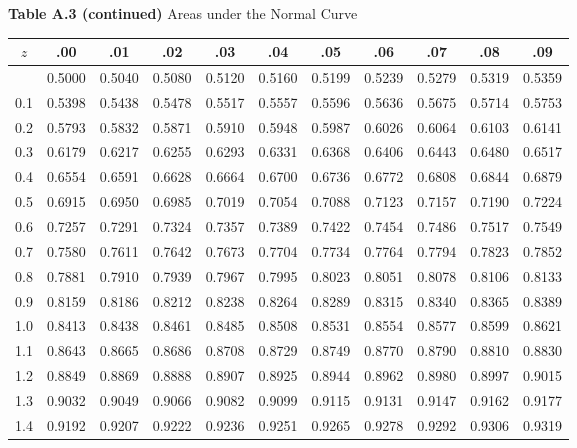 \documentclass[12pt,a4paper]{article}
\begin{document}
\begin{enumerate}
\vspace{0.3cm}
\noindent\textbf{Table A.3 (continued)} Areas under the Normal Curve
\vspace{0.2cm}

\begin{center}
\small
\begin{longtable}{ccccccccccc}
\toprule\toprule
$z$ & .00 & .01 & .02 & .03 & .04 & .05 & .06 & .07 & .08 & .09 \\
\midrule
\endhead
\bottomrule\bottomrule
\endfoot
0.0 & 0.5000 & 0.5040 & 0.5080 & 0.5120 & 0.5160 & 0.5199 & 0.5239 & 0.5279 & 0.5319 & 0.5359 \\
0.1 & 0.5398 & 0.5438 & 0.5478 & 0.5517 & 0.5557 & 0.5596 & 0.5636 & 0.5675 & 0.5714 & 0.5753 \\
0.2 & 0.5793 & 0.5832 & 0.5871 & 0.5910 & 0.5948 & 0.5987 & 0.6026 & 0.6064 & 0.6103 & 0.6141 \\
0.3 & 0.6179 & 0.6217 & 0.6255 & 0.6293 & 0.6331 & 0.6368 & 0.6406 & 0.6443 & 0.6480 & 0.6517 \\
0.4 & 0.6554 & 0.6591 & 0.6628 & 0.6664 & 0.6700 & 0.6736 & 0.6772 & 0.6808 & 0.6844 & 0.6879 \\
0.5 & 0.6915 & 0.6950 & 0.6985 & 0.7019 & 0.7054 & 0.7088 & 0.7123 & 0.7157 & 0.7190 & 0.7224 \\
0.6 & 0.7257 & 0.7291 & 0.7324 & 0.7357 & 0.7389 & 0.7422 & 0.7454 & 0.7486 & 0.7517 & 0.7549 \\
0.7 & 0.7580 & 0.7611 & 0.7642 & 0.7673 & 0.7704 & 0.7734 & 0.7764 & 0.7794 & 0.7823 & 0.7852 \\
0.8 & 0.7881 & 0.7910 & 0.7939 & 0.7967 & 0.7995 & 0.8023 & 0.8051 & 0.8078 & 0.8106 & 0.8133 \\
0.9 & 0.8159 & 0.8186 & 0.8212 & 0.8238 & 0.8264 & 0.8289 & 0.8315 & 0.8340 & 0.8365 & 0.8389 \\
1.0 & 0.8413 & 0.8438 & 0.8461 & 0.8485 & 0.8508 & 0.8531 & 0.8554 & 0.8577 & 0.8599 & 0.8621 \\
1.1 & 0.8643 & 0.8665 & 0.8686 & 0.8708 & 0.8729 & 0.8749 & 0.8770 & 0.8790 & 0.8810 & 0.8830 \\
1.2 & 0.8849 & 0.8869 & 0.8888 & 0.8907 & 0.8925 & 0.8944 & 0.8962 & 0.8980 & 0.8997 & 0.9015 \\
1.3 & 0.9032 & 0.9049 & 0.9066 & 0.9082 & 0.9099 & 0.9115 & 0.9131 & 0.9147 & 0.9162 & 0.9177 \\
1.4 & 0.9192 & 0.9207 & 0.9222 & 0.9236 & 0.9251 & 0.9265 & 0.9278 & 0.9292 & 0.9306 & 0.9319 \\

\end{longtable}
\end{center}
\end{enumerate}
\end{document}
